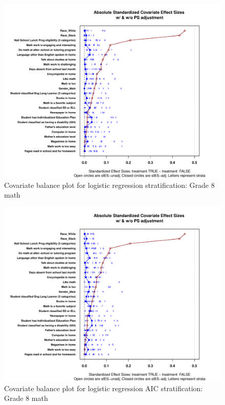 \begin{figure}[h!]
\begin{center}
\includegraphics[width=\textwidth]{../Figures2009/g8math-lr-balance.pdf}
\caption{Covariate balance plot for logistic regression stratification: Grade 8 math}
\end{center}
\end{figure}

\begin{figure}
\begin{center}
\includegraphics[width=\textwidth]{../Figures2009/g8math-lrAIC-balance.pdf}
\caption{Covariate balance plot for logistic regression AIC stratification: Grade 8 math}
\end{center}
\end{figure}

